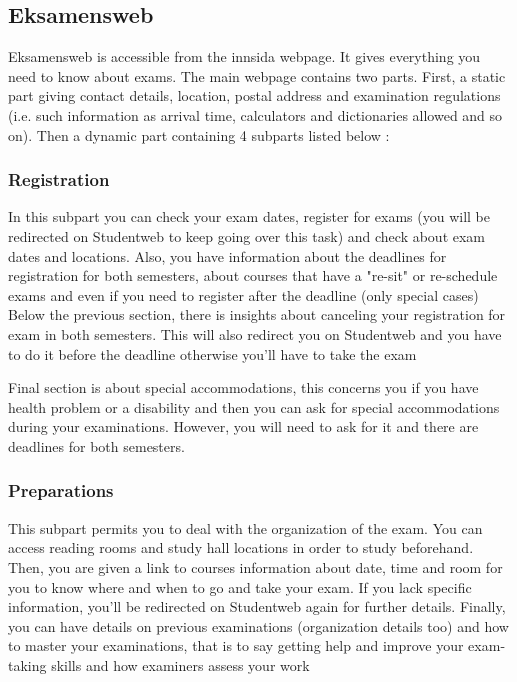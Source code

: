 \subsection{Eksamensweb}

Eksamensweb is accessible from the innsida webpage. It gives everything you need to know about 
exams. The main webpage contains two parts. First, a static part giving contact details, location, 
postal address and examination regulations (i.e. such information as arrival time, calculators and 
dictionaries allowed and so on). Then a dynamic part containing 4 subparts listed below :

\subsubsection{Registration}

In this subpart you can check your exam dates, register for exams (you will be redirected on 
Studentweb to keep going over this task) and check about exam dates and locations. 
Also, you have information about the deadlines for registration for both semesters, about 
courses that have a "re-sit" or re-schedule exams and even if you need to register after the 
deadline (only special cases)
Below the previous section, there is insights about canceling your registration for exam in 
both semesters. This will also redirect you on Studentweb and you have to do it before the 
deadline otherwise you'll have to take the exam 


Final section is about special accommodations, this concerns you if you have health problem 
or a disability and then you can ask for special accommodations during your examinations. 
However, you will need to ask for it and there are deadlines for both semesters.

\subsubsection{Preparations}

This subpart permits you to deal with the organization of the exam. You can access reading 
rooms and study hall locations in order to study beforehand.
Then, you are given a link to courses information about date, time and room for you to know 
where and when to go and take your exam. If you lack specific information, you'll be 
redirected on Studentweb again for further details.
Finally, you can have details on previous examinations (organization details too) and how to 
master your examinations, that is to say getting help and improve your exam-taking skills and 
how examiners assess your work

